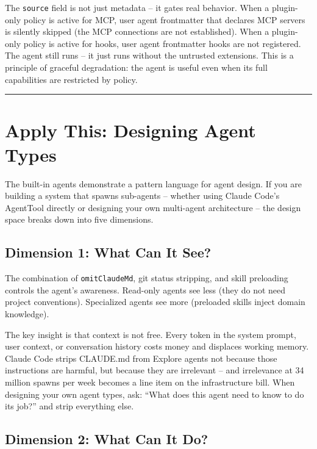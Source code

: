 \documentclass[
  english,
  11pt,
  letterpaper,
]{book}
\begin{document}
The \texttt{source} field is not just metadata -- it gates real
behavior. When a plugin-only policy is active for MCP, user agent
frontmatter that declares MCP servers is silently skipped (the MCP
connections are not established). When a plugin-only policy is active
for hooks, user agent frontmatter hooks are not registered. The agent
still runs -- it just runs without the untrusted extensions. This is a
principle of graceful degradation: the agent is useful even when its
full capabilities are restricted by policy.

\begin{center}\rule{0.5\linewidth}{0.5pt}\end{center}

\section{Apply This: Designing Agent
Types}\label{apply-this-designing-agent-types}

The built-in agents demonstrate a pattern language for agent design. If
you are building a system that spawns sub-agents -- whether using Claude
Code's AgentTool directly or designing your own multi-agent architecture
-- the design space breaks down into five dimensions.

\subsection{Dimension 1: What Can It
See?}\label{dimension-1-what-can-it-see}

The combination of \texttt{omitClaudeMd}, git status stripping, and
skill preloading controls the agent's awareness. Read-only agents see
less (they do not need project conventions). Specialized agents see more
(preloaded skills inject domain knowledge).

The key insight is that context is not free. Every token in the system
prompt, user context, or conversation history costs money and displaces
working memory. Claude Code strips CLAUDE.md from Explore agents not
because those instructions are harmful, but because they are irrelevant
-- and irrelevance at 34 million spawns per week becomes a line item on
the infrastructure bill. When designing your own agent types, ask:
``What does this agent need to know to do its job?'' and strip
everything else.

\subsection{Dimension 2: What Can It
Do?}\label{dimension-2-what-can-it-do}
\end{document}
